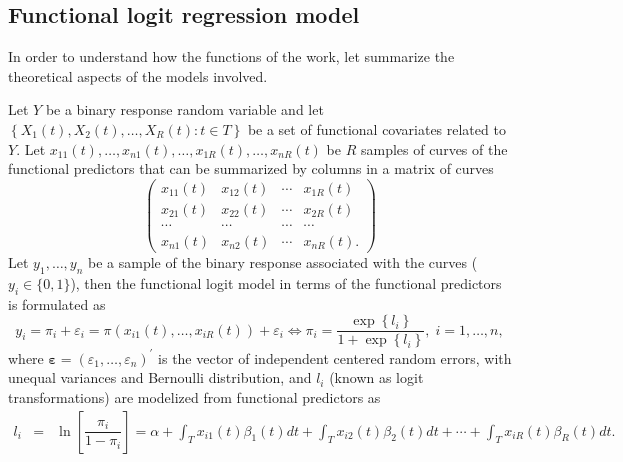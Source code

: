\subsection{Functional logit regression model}

In order to understand how the functions of the  work, let summarize the theoretical aspects of the models involved.

Let $Y$ be a binary response random variable and let $\left\{ X_1\left( t\right),X_2\left( t\right),\ldots,X_R\left( t\right) :t\in T\right\} $ be a set of functional covariates related to $Y.$ Let $x_{11}\left( t\right) ,\ldots ,x_{n1}\left( t\right),\ldots,x_{1R}\left( t\right) ,\ldots ,x_{nR}\left( t\right) $ be $R$ samples of curves of the functional predictors that can be summarized by columns in a matrix of curves
\begin{equation}
\left( 
\begin{array}{cccc}
x_{11}\left( t\right) & x_{12}\left( t\right) & \cdots & x_{1R}\left(
t\right) \\ 
x_{21}\left( t\right) & x_{22}\left( t\right) & \cdots & x_{2R}\left(
t\right) \\ 
\cdots & \cdots & \cdots & \cdots \\ 
x_{n1}\left( t\right) & x_{n2}\left( t\right) & \cdots & x_{nR}\left(
t\right).
\end{array}
\right) \label{PredictorsMatrix}
\end{equation}
Let $y_{1},\ldots,y_{n}$ be a sample of the binary response associated with the curves ($y_i \in \{0,1\}$), then the functional logit model in terms of the functional predictors is formulated as
\begin{equation}
y_{i}=\pi _{i}+\varepsilon _{i}=\pi \left( x_{i1}\left( t\right),\ldots,x_{iR}\left( t\right) \right)
+\varepsilon _{i} \Leftrightarrow \pi _{i}=\dfrac{\exp \left\{ l_i \right\} }{1+\exp \left\{ l_i\right\} },\;i=1,\ldots ,n,  \label{probfun}
\end{equation}
where $\boldsymbol{\varepsilon} =\left( \varepsilon _{1},\ldots
,\varepsilon _{n}\right)
^{\prime}$ is the vector of independent centered random errors, with unequal variances and Bernoulli distribution, and $l_i$ (known as logit transformations) are modelized from functional predictors as
\begin{eqnarray}
l_{i}&=&\ln \left[ \dfrac{\pi _{i}}{1-\pi _{i}}\right] =\alpha
+\int_{T}x_{i1}\left( t\right) \beta_1 \left( t\right) dt+\int_{T}x_{i2}\left( t\right) \beta_2 \left( t\right) dt+\cdots+\int_{T}x_{iR}\left( t\right) \beta_R \left( t\right) dt.
\end{eqnarray}
